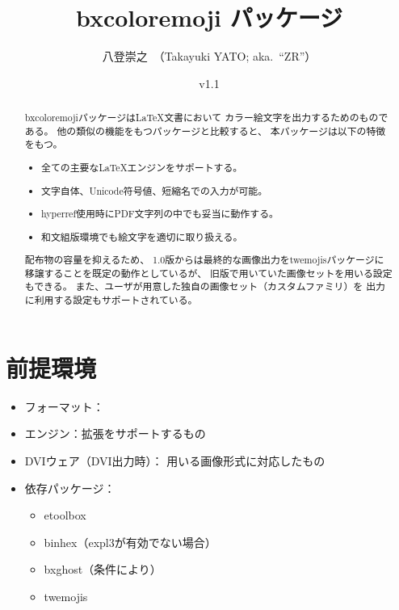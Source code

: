 \documentclass[a4paper]{ltjsarticle}
\newcommand{\PkgVersion}{1.1}
\newcommand{\PkgDate}{2026/06/22}
\newcommand{\Pkg}[1]{\textsf{#1}}
\newcommand{\Means}{：\quad}
\newcommand{\／}{\mbox{}／\mbox{}}
\begin{document}
\title{\Pkg{bxcoloremoji} パッケージ}
\author{八登崇之\ （Takayuki YATO; aka.~“ZR”）}
\date{v\PkgVersion\quad[\PkgDate]}
\maketitle

\begin{abstract}
\Pkg{bxcoloremoji}パッケージは{\LaTeX}文書において
カラー絵文字を出力するためのものである。
他の類似の機能をもつパッケージと比較すると、
本パッケージは以下の特徴をもつ。
\begin{itemize}
\item 全ての主要な{\LaTeX}エンジンをサポートする。
\item 文字自体、Unicode符号値、短縮名での入力が可能。
\item \Pkg{hyperref}使用時にPDF文字列の中でも妥当に動作する。
\item 和文組版環境でも絵文字を適切に取り扱える。
\end{itemize}

配布物の容量を抑えるため、
1.0版からは最終的な画像出力を\Pkg{twemojis}パッケージに
移譲することを既定の動作としているが、
旧版で用いていた画像セットを用いる設定もできる。
また、ユーザが用意した独自の画像セット（カスタムファミリ）を
出力に利用する設定もサポートされている。
\end{abstract}

\tableofcontents


\section{前提環境}
\label{sec:Prerequisites}

\begin{itemize}
\item フォーマット\Means {\LaTeX}
\item エンジン\Means {\eTeX}拡張をサポートするもの
\item DVIウェア（DVI出力時）\Means
  用いる画像形式に対応したもの
\item 依存パッケージ\Means
  \begin{itemize}
  \item \Pkg{etoolbox}
  \item \Pkg{binhex}（expl3が有効でない場合）
  \item \Pkg{bxghost}（条件により）
  \item \Pkg{twemojis}
  \end{itemize}
\end{itemize}
\end{document}
